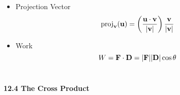 \begin{itemize}
    \item Projection Vector
      \[\textrm{proj}_{\mathbf{v}}(\mathbf{u}) = \left(\frac{\mathbf{u}\cdot\mathbf{v}}{|\mathbf{v}|} \right)\frac{\mathbf{v}}{|\mathbf{v}|}\]

    \item Work
      \[W = \mathbf{F} \cdot \mathbf{D} = |\mathbf{F}||\mathbf{D}|\cos \theta\]\
    
    \end{itemize}
  
\newpage

\centerline{\bf 12.4 The Cross Product}
  

